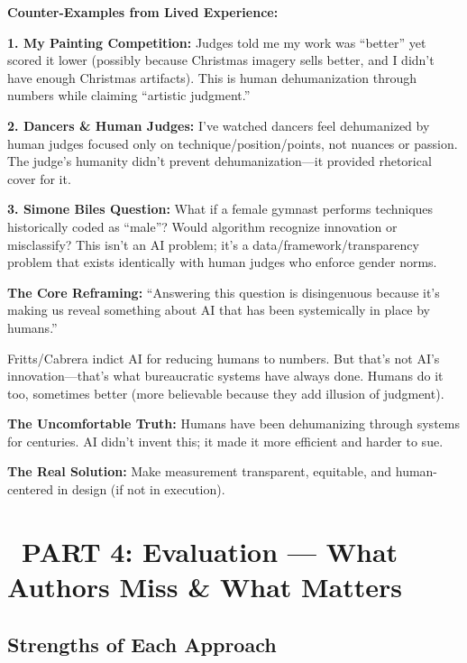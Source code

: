 \documentclass[12pt,letterpaper]{article}
\begin{document}
\begin{personalreflection}
\textbf{Counter-Examples from Lived Experience:}

\textbf{1. My Painting Competition:} Judges told me my work was ``better'' yet scored it lower (possibly because Christmas imagery sells better, and I didn't have enough Christmas artifacts). This is human dehumanization through numbers while claiming ``artistic judgment.''

\textbf{2. Dancers \& Human Judges:} I've watched dancers feel dehumanized by human judges focused only on technique/position/points, not nuances or passion. The judge's humanity didn't prevent dehumanization—it provided rhetorical cover for it.

\textbf{3. Simone Biles Question:} What if a female gymnast performs techniques historically coded as ``male''? Would algorithm recognize innovation or misclassify? This isn't an AI problem; it's a data/framework/transparency problem that exists identically with human judges who enforce gender norms.
\end{personalreflection}

\begin{criticalinsight}
\textbf{The Core Reframing:} ``Answering this question is disingenuous because it's making us reveal something about AI that has been systemically in place by humans.''

Fritts/Cabrera indict AI for reducing humans to numbers. But that's not AI's innovation—that's what bureaucratic systems have always done. Humans do it too, sometimes better (more believable because they add illusion of judgment).
\end{criticalinsight}

\textbf{The Uncomfortable Truth:} Humans have been dehumanizing through systems for centuries. AI didn't invent this; it made it more efficient and harder to sue.

\textbf{The Real Solution:} Make measurement transparent, equitable, and human-centered in design (if not in execution).

\newpage
\section*{\color{primaryblue}\faChartBar\ PART 4: Evaluation — What Authors Miss \& What Matters}

\subsection*{Strengths of Each Approach}
\end{document}
